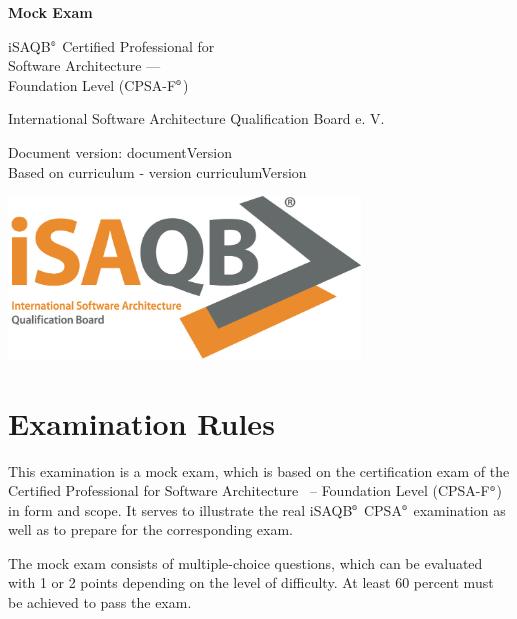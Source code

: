 \documentclass[12pt,a4paper]{article}
\newcounter{examQuestion}\setcounter{examQuestion}{1}
\newcommand{\registered}{$^\textrm{\tiny\textregistered}$}
\begin{document}
\pagestyle{fancy}

\begin{titlepage}
  \begin{center}
   {\huge\bfseries Mock Exam

     iSAQB\registered{} Certified Professional for\\ Software Architecture ---\\[2ex]
     
     Foundation Level (CPSA-F\registered{})}

  \bigskip
  
  {\large International Software Architecture Qualification Board
    e. V.}

  \bigskip

  Document version: {{documentVersion}}\\
  Based on curriculum - version {{curriculumVersion}}
\end{center}

\vspace*{\fill}

\begin{center}
\includegraphics[width=0.7\textwidth]{isaqb-logo}
\end{center}

\end{titlepage}

\section*{Examination Rules}

This examination is a mock exam, which is based on the certification
exam of the Certified Professional for Software Architecture ~--
Foundation Level (CPSA-F\registered{}) in form and scope. It serves to illustrate
the real iSAQB\registered{} CPSA\registered{} examination as well as to prepare for the
corresponding exam.

The mock exam consists of \examQuestionCount{} multiple-choice
questions, which can be evaluated with 1 or 2 points depending on the
level of difficulty. At least 60 percent must be achieved to pass the
exam.
\end{document}

